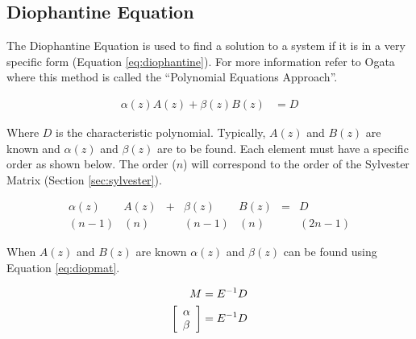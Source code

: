 \documentclass{article}
\newcommand{\sincludepdf}[2][]{
	
}
\begin{document}
\sincludepdf[pages={11},
			pagecommand=\subsubsection{Example 1}
		]{scan/11211301.pdf}

\sincludepdf[pages={12},
			pagecommand=\subsubsection{Example 2}
		]{scan/11211301.pdf}

\sincludepdf[pages={13},
			pagecommand=\subsubsection{Example 3}
		]{scan/11211301.pdf}

\subsection{Diophantine Equation}

The Diophantine Equation is used to find a solution to a system
if it is in a very specific form (Equation \ref{eq:diophantine}).
For more information refer to Ogata\autocite[Pg. 525]{ogata1995discrete}
where this method is called the ``Polynomial Equations Approach''.

\begin{align}
	\alpha(z)A(z) + \beta(z)B(z) &= D \label{eq:diophantine}
\end{align}

Where $D$ is the characteristic polynomial.
Typically, $A(z)$ and $B(z)$ are known and $\alpha(z)$ and $\beta(z)$
are to be found.
Each element must have a specific order as shown below.
The order ($n$) will correspond to the order of the
Sylvester Matrix (Section \ref{sec:sylvester}).

\[
\begin{array}{ccccccc}
	\alpha(z) &A(z) &+ &\beta(z) &B(z) &= &D \\
	  (n-1)   &(n)  &  & (n-1)  &(n) & &(2n-1)
\end{array}
\]

When $A(z)$ and $B(z)$ are known $\alpha(z)$ and $\beta(z)$
can be found using Equation \ref{eq:diopmat}.

\begin{align}
	M &= E^{-1} D \label{eq:diopmat} \\
	\left[
	\begin{array}{l}
		\alpha \\
		\beta
	\end{array}
	\right] &= E^{-1} D \notag
\end{align}
\end{document}
